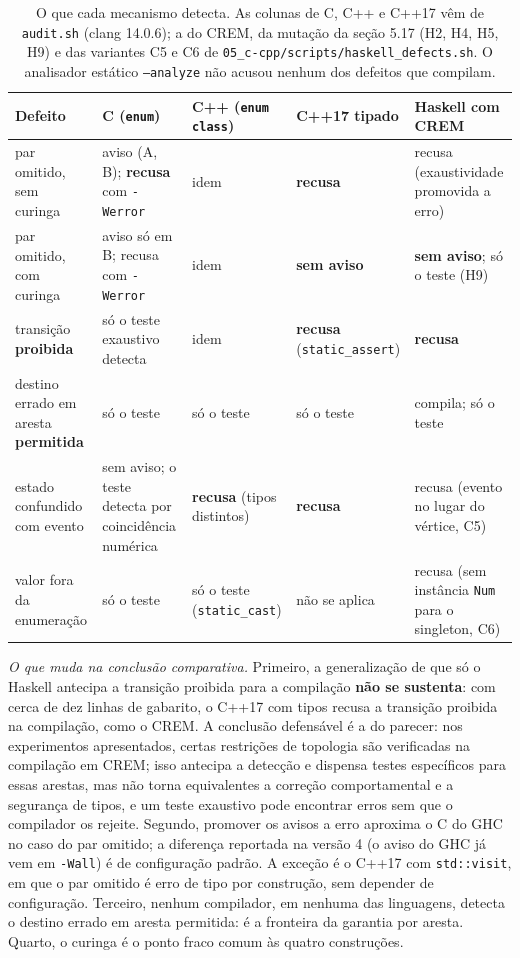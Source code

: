 \documentclass[12pt,a4paper]{article}
\begin{document}
\begin{table}[h]
\centering
\scriptsize
\begin{tabular}{|p{3.2cm}|p{2.9cm}|p{2.9cm}|p{2.4cm}|p{2.2cm}|}
\hline
Defeito & C (\texttt{enum}) & C++ (\texttt{enum class}) & C++17 tipado & Haskell com CREM \\
\hline
par omitido, sem curinga & aviso (A, B); \textbf{recusa} com \texttt{-Werror} & idem & \textbf{recusa} & recusa (exaustividade promovida a erro) \\
\hline
par omitido, com curinga & aviso só em B; recusa com \texttt{-Werror} & idem & \textbf{sem aviso} & \textbf{sem aviso}; só o teste (H9) \\
\hline
transição \textbf{proibida} & só o teste exaustivo detecta & idem & \textbf{recusa} (\texttt{static\_assert}) & \textbf{recusa} \\
\hline
destino errado em aresta \textbf{permitida} & só o teste & só o teste & só o teste & compila; só o teste \\
\hline
estado confundido com evento & sem aviso; o teste detecta por coincidência numérica & \textbf{recusa} (tipos distintos) & \textbf{recusa} & recusa (evento no lugar do vértice, C5) \\
\hline
valor fora da enumeração & só o teste & só o teste (\texttt{static\_cast}) & não se aplica & recusa (sem instância \texttt{Num} para o singleton, C6) \\
\hline
\end{tabular}
\caption{O que cada mecanismo detecta. As colunas de C, C++ e C++17 vêm de \texttt{audit.sh} (clang 14.0.6); a do CREM, da mutação da seção 5.17 (H2, H4, H5, H9) e das variantes C5 e C6 de \texttt{05\_c-cpp/scripts/haskell\_defects.sh}. O analisador estático \texttt{--analyze} não acusou nenhum dos defeitos que compilam.}
\end{table}

\textit{O que muda na conclusão comparativa.} Primeiro, a generalização de que só o Haskell antecipa a transição proibida para a compilação \textbf{não se sustenta}: com cerca de dez linhas de gabarito, o C++17 com tipos recusa a transição proibida na compilação, como o CREM. A conclusão defensável é a do parecer: nos experimentos apresentados, certas restrições de topologia são verificadas na compilação em CREM; isso antecipa a detecção e dispensa testes específicos para essas arestas, mas não torna equivalentes a correção comportamental e a segurança de tipos, e um teste exaustivo pode encontrar erros sem que o compilador os rejeite. Segundo, promover os avisos a erro aproxima o C do GHC no caso do par omitido; a diferença reportada na versão 4 (o aviso do GHC já vem em \texttt{-Wall}) é de configuração padrão. A exceção é o C++17 com \texttt{std::visit}, em que o par omitido é erro de tipo por construção, sem depender de configuração. Terceiro, nenhum compilador, em nenhuma das linguagens, detecta o destino errado em aresta permitida: é a fronteira da garantia por aresta. Quarto, o curinga é o ponto fraco comum às quatro construções.
\end{document}
